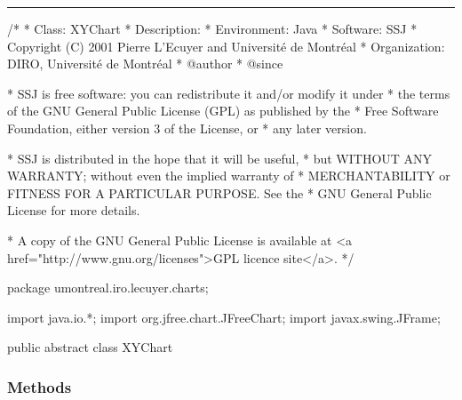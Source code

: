 \bigskip\hrule
\begin{code}
\begin{hide}
/*
 * Class:        XYChart
 * Description:  
 * Environment:  Java
 * Software:     SSJ 
 * Copyright (C) 2001  Pierre L'Ecuyer and Université de Montréal
 * Organization: DIRO, Université de Montréal
 * @author       
 * @since

 * SSJ is free software: you can redistribute it and/or modify it under
 * the terms of the GNU General Public License (GPL) as published by the
 * Free Software Foundation, either version 3 of the License, or
 * any later version.

 * SSJ is distributed in the hope that it will be useful,
 * but WITHOUT ANY WARRANTY; without even the implied warranty of
 * MERCHANTABILITY or FITNESS FOR A PARTICULAR PURPOSE.  See the
 * GNU General Public License for more details.

 * A copy of the GNU General Public License is available at
   <a href="http://www.gnu.org/licenses">GPL licence site</a>.
 */
\end{hide}
package umontreal.iro.lecuyer.charts;\begin{hide}
import java.io.*;
import org.jfree.chart.JFreeChart;
import javax.swing.JFrame;\end{hide}

public abstract class XYChart \begin{hide} {
   protected Axis XAxis;
   protected Axis YAxis;

   protected SSJXYSeriesCollection dataset;
   protected JFreeChart chart;
   protected boolean latexDocFlag = true;

   protected boolean autoRange;
   protected double[] manualRange;

   protected boolean grid = false;
   protected double xstepGrid;
   protected double ystepGrid;

   // this flag is set true when plotting probabilities. In that case,
   // y is always >= 0.
   protected boolean probFlag = false;

   protected double chartMargin = 0.02;   // margin around the chart
\end{hide}
\end{code}

\subsubsection*{Methods}

